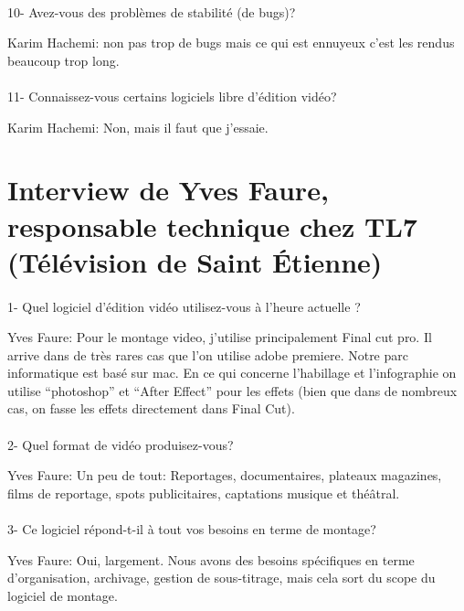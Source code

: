 \paragraph{}
10- Avez-vous des problèmes de stabilité (de bugs)?

Karim Hachemi: non pas trop de bugs mais ce qui est ennuyeux c'est les
rendus beaucoup trop long.

\paragraph{}
11- Connaissez-vous certains logiciels libre d'édition vidéo?

Karim Hachemi: Non, mais il faut que j'essaie.

\newpage\section*{Interview de Yves Faure, responsable technique chez TL7
(Télévision de Saint Étienne)}

\paragraph{}
1-  Quel logiciel d'édition vidéo utilisez-vous à l'heure actuelle ?

Yves Faure: Pour le montage video, j'utilise principalement Final cut pro. Il
arrive dans de très rares cas que l'on utilise adobe premiere. Notre
parc informatique est basé sur mac. En ce qui concerne l'habillage et
l'infographie on utilise ``photoshop'' et  ``After Effect'' pour les effets (bien
que dans de nombreux cas, on fasse les effets directement dans Final Cut).

\paragraph{}
2- Quel format de vidéo produisez-vous?

Yves Faure: Un peu de tout: Reportages, documentaires, plateaux magazines, films de reportage, spots
publicitaires, captations musique et théâtral.

\paragraph{}
3- Ce logiciel répond-t-il à tout vos besoins en terme de montage?

Yves Faure: Oui, largement. Nous avons des besoins spécifiques en terme d'organisation,
archivage, gestion de sous-titrage, mais cela sort du scope du logiciel de
montage.

